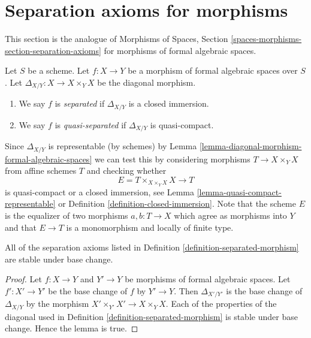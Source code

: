 \section{Separation axioms for morphisms}
\label{section-separation-axioms}

\noindent
This section is the analogue of
Morphisms of Spaces, Section \ref{spaces-morphisms-section-separation-axioms}
for morphisms of formal algebraic spaces.

\begin{definition}
\label{definition-separated-morphism}
Let $S$ be a scheme.
Let $f : X \to Y$ be a morphism of formal algebraic spaces over $S$.
Let $\Delta_{X/Y} : X \to X \times_Y X$ be the diagonal morphism.
\begin{enumerate}
\item We say $f$ is {\it separated} if $\Delta_{X/Y}$ is a closed immersion.
\item We say $f$ is {\it quasi-separated} if $\Delta_{X/Y}$ is quasi-compact.
\end{enumerate}
\end{definition}

\noindent
Since $\Delta_{X/Y}$ is representable (by schemes) by
Lemma \ref{lemma-diagonal-morphism-formal-algebraic-spaces}
we can test this by considering morphisms $T \to X \times_Y X$
from affine schemes $T$ and checking whether
$$
E = T \times_{X \times_Y X} X \longrightarrow T
$$
is quasi-compact or a closed immersion, see
Lemma \ref{lemma-quasi-compact-representable} or
Definition \ref{definition-closed-immersion}.
Note that the scheme $E$ is the equalizer of two morphisms
$a, b : T \to X$ which agree as morphisms into $Y$
and that $E \to T$ is a monomorphism and locally of finite type.

\begin{lemma}
\label{lemma-base-change-separated}
All of the separation axioms listed in
Definition \ref{definition-separated-morphism}
are stable under base change.
\end{lemma}

\begin{proof}
Let $f : X \to Y$ and $Y' \to Y$ be morphisms of formal algebraic spaces.
Let $f' : X' \to Y'$ be the base change of $f$ by $Y' \to Y$. Then
$\Delta_{X'/Y'}$ is the base change of $\Delta_{X/Y}$ by
the morphism $X' \times_{Y'} X' \to X \times_Y X$. Each of the properties
of the diagonal used in Definition \ref{definition-separated-morphism}
is stable under base change. Hence the lemma is true.
\end{proof}

